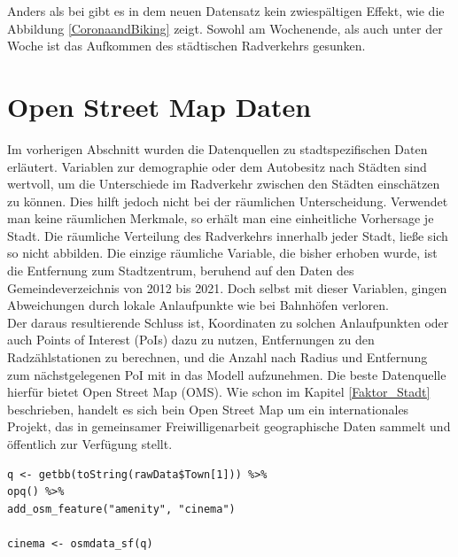 \documentclass[a4paper,12pt]{thesis}
\begin{document}
Anders als bei \cite{Moellers2021} gibt es in dem neuen Datensatz kein zwiespältigen Effekt, wie die Abbildung \ref{CoronaandBiking} zeigt. Sowohl am Wochenende, als auch unter der Woche ist das Aufkommen des städtischen Radverkehrs gesunken.



\section{Open Street Map Daten}\label{OMSDATA}

Im vorherigen Abschnitt wurden die Datenquellen zu stadtspezifischen Daten erläutert. Variablen zur demographie oder dem Autobesitz nach Städten sind wertvoll, um die Unterschiede im Radverkehr zwischen den Städten einschätzen zu können. Dies hilft jedoch nicht bei der räumlichen Unterscheidung. Verwendet man keine räumlichen Merkmale, so erhält man eine einheitliche Vorhersage je Stadt. Die räumliche Verteilung des Radverkehrs innerhalb jeder Stadt, ließe sich so nicht abbilden. Die einzige räumliche Variable, die bisher erhoben wurde, ist die Entfernung zum Stadtzentrum, beruhend auf den Daten des Gemeindeverzeichnis von 2012 bis 2021. Doch selbst mit dieser Variablen, gingen Abweichungen durch lokale Anlaufpunkte wie bei Bahnhöfen verloren.\\
Der daraus resultierende Schluss ist, Koordinaten zu solchen Anlaufpunkten oder auch Points of Interest (PoIs) dazu zu nutzen, Entfernungen zu den Radzählstationen zu berechnen, und die Anzahl nach Radius und Entfernung zum nächstgelegenen PoI mit in das Modell aufzunehmen. Die beste Datenquelle hierfür bietet Open Street Map (OMS). Wie schon im Kapitel \ref{Faktor_Stadt} beschrieben, handelt es sich bein Open Street Map um ein internationales Projekt, das in gemeinsamer Freiwilligenarbeit geographische Daten sammelt und öffentlich zur Verfügung stellt.\\

\begin{lstlisting}[caption={OSM Daten Abfrage},label=code:osmdata_query]
q <- getbb(toString(rawData$Town[1])) %>%
opq() %>%
add_osm_feature("amenity", "cinema")
	
cinema <- osmdata_sf(q)
\end{lstlisting}
\end{document}
